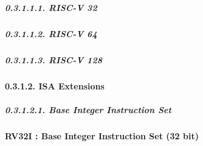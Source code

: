 \documentclass[
]{article}
\begin{document}
\hypertarget{risc-v-32}{%
\subparagraph{0.3.1.1.1. RISC-V 32}\label{risc-v-32}}

\hypertarget{risc-v-64}{%
\subparagraph{0.3.1.1.2. RISC-V 64}\label{risc-v-64}}

\hypertarget{risc-v-128}{%
\subparagraph{0.3.1.1.3. RISC-V 128}\label{risc-v-128}}

\hypertarget{isa-extensions}{%
\paragraph{0.3.1.2. ISA Extensions}\label{isa-extensions}}

\hypertarget{base-integer-instruction-set}{%
\subparagraph{0.3.1.2.1. Base Integer Instruction
Set}\label{base-integer-instruction-set}}

\textbf{RV32I : Base Integer Instruction Set (32 bit)}
\end{document}
